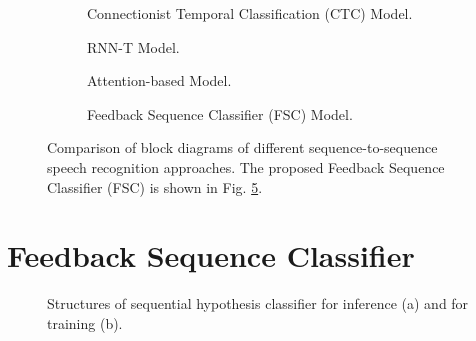\documentclass{article}
\begin{document}
\begin{figure}
  \centering
  \begin{subfigure}[b]{0.35\textwidth}
    \centering
    \resizebox{23mm}{!}{
      
    } 
    \caption {
      Connectionist Temporal Classification (CTC) Model.
      \label{fig:ctc_diagram}
    }
  \end{subfigure}
  \begin{subfigure}[b]{0.60\textwidth}
    \centering
    \resizebox{78mm}{!}{
      
    }
    \caption {
      RNN-T Model.
      \label{fig:rnn_t_diagram}
    }
  \end{subfigure}

  \begin{subfigure}[b]{0.55\textwidth}
    \centering
    \resizebox{53mm}{!}{
      
    }
    \caption {
      Attention-based Model.
      \label{fig:attention_diagram}
    }
  \end{subfigure}
  \begin{subfigure}[b]{0.3\textwidth}
    \centering
    \resizebox{26mm}{!}{
      
    }
    \caption {
      Feedback Sequence Classifier (FSC) Model.
      \label{fig:fsc_diagram}
    }
  \end{subfigure}
  \caption{
    Comparison of block diagrams of different sequence-to-sequence speech
    recognition approaches.
    The proposed Feedback Sequence Classifier (FSC) is shown in 
    Fig. \ref{fig:fsc_diagram}.
  }

\end{figure}


\section{Feedback Sequence Classifier}
\label{sec:feedback_sequence_classifier}

\begin{figure}
  \centering
  \begin{subfigure}[b]{0.35\textwidth}
    \centering
    \resizebox{50mm}{!}{
      
    } 
  \caption {
    \label{fig:structure_for_inference}
  } 
  \end{subfigure}
  \begin{subfigure}[b]{0.35\textwidth}
    \centering
    \resizebox{43mm}{!}{
      
    } 
  \caption {
    \label{fig:structure_for_training}
  }
  \end{subfigure}
  \caption{
    Structures of sequential hypothesis classifier for inference (a) 
    and for training (b).
  }

\end{figure}
\end{document}
